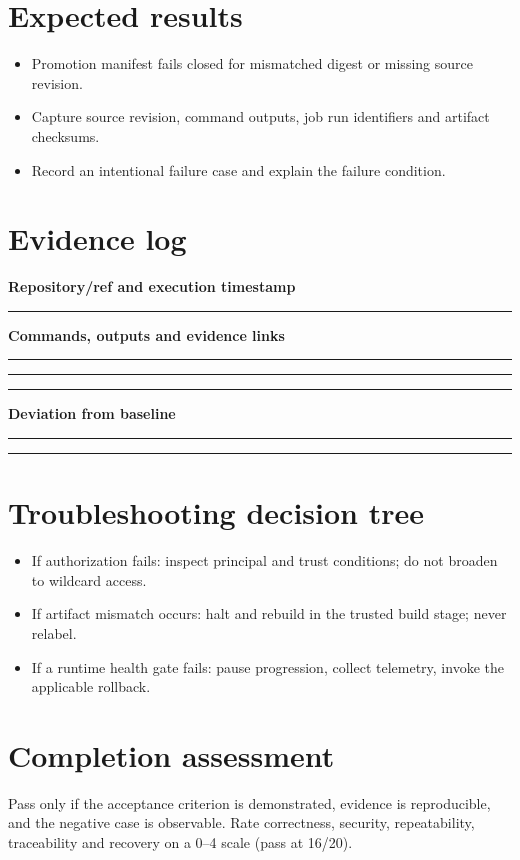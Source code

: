 \documentclass[10pt,letterpaper]{article}
\begin{document}
\section{Expected results}
\begin{itemize}
\item Promotion manifest fails closed for mismatched digest or missing source revision.
\item Capture source revision, command outputs, job run identifiers and artifact checksums.
\item Record an intentional failure case and explain the failure condition.
\end{itemize}

\section{Evidence log}
\textbf{Repository/ref and execution timestamp}\par
\noindent\rule{\linewidth}{0.35pt}\par\vspace{0.7em}
\textbf{Commands, outputs and evidence links}\par
\noindent\rule{\linewidth}{0.35pt}\par\vspace{0.7em}
\noindent\rule{\linewidth}{0.35pt}\par\vspace{0.7em}
\noindent\rule{\linewidth}{0.35pt}\par\vspace{0.7em}
\textbf{Deviation from baseline}\par
\noindent\rule{\linewidth}{0.35pt}\par\vspace{0.7em}
\noindent\rule{\linewidth}{0.35pt}\par\vspace{0.7em}

\section{Troubleshooting decision tree}
\begin{itemize}
\item If authorization fails: inspect principal and trust conditions; do not broaden to wildcard access.
\item If artifact mismatch occurs: halt and rebuild in the trusted build stage; never relabel.
\item If a runtime health gate fails: pause progression, collect telemetry, invoke the applicable rollback.
\end{itemize}

\section{Completion assessment}
Pass only if the acceptance criterion is demonstrated, evidence is reproducible, and the negative case is observable. Rate correctness, security, repeatability, traceability and recovery on a 0--4 scale (pass at 16/20).
\end{document}
